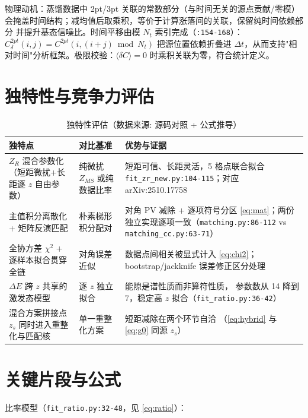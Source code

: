 \documentclass[UTF8]{ctexart}
\begin{document}
物理动机：蒸馏数据中 2pt/3pt 关联的常数部分（与时间无关的源点贡献/零模）
会掩盖时间结构；减均值后取乘积，等价于计算涨落间的关联，保留纯时间依赖部分
并提升基态信噪比。时间平移由模 $N_t$ 索引完成（\texttt{:154-168}）：
$C^{2pt}_{\delta}(i,j) = C^{2pt}(i,(i+j)\bmod N_t)$ 把源位置依赖折叠进
$\Delta t$，从而支持"相对时间"分析框架。极限校验：$\langle\delta C\rangle=0$
时乘积关联为零，符合统计定义。

\section{独特性与竞争力评估}

\begin{table}[htbp]\centering
\begin{tabularx}{\textwidth}{lXX}
\toprule
\textcolor{algo}{独特点} & 对比基准 & 优势与证据 \\
\midrule
$Z_R$ 混合参数化（短距微扰+长距逐 $z$ 自由参数） & 纯微扰 $Z_{MS}$ 或纯数据比率 & 短距可信、长距灵活，5 格点联合拟合
\texttt{\nolinkurl{fit_zr_new.py:104-115}}；对应 arXiv:2510.17758 \\
\hline
主值积分离散化 + 矩阵反演匹配 & 朴素梯形积分配对 & 对角 PV 减除 + 逐项符号分区
\eqref{eq:mat}；两份独立实现逐项一致（\texttt{\nolinkurl{matching.py:86-112}} vs
\texttt{\nolinkurl{matching_cc.py:63-71}}） \\
\hline
全协方差 $\chi^2$ + 逐样本拟合贯穿全链 & 对角误差近似 & 数据点间相关被显式计入
\eqref{eq:chi2}；bootstrap/jackknife 误差修正区分处理 \\
\hline
$\Delta E$ 跨 $z$ 共享的激发态模型 & 逐 $z$ 独立拟合 & 能隙是谱性质而非算符性质，
参数数从 14 降到 7，稳定高 $z$ 拟合（\texttt{\nolinkurl{fit_ratio.py:36-42}}） \\
\hline
混合方案拼接点 $z_s$ 同时进入重整化与匹配核 & 单一重整化方案 & 短距减除在两个环节自洽
（\eqref{eq:hybrid} 与 \eqref{eq:g0} 同源 $z_s$） \\
\bottomrule
\end{tabularx}
\caption{独特性评估（数据来源: 源码对照 + 公式推导）}
\end{table}

\section{关键片段与公式}

比率模型（\texttt{fit\_ratio.py:32-48}，见 \eqref{eq:ratio}）：

\end{document}

